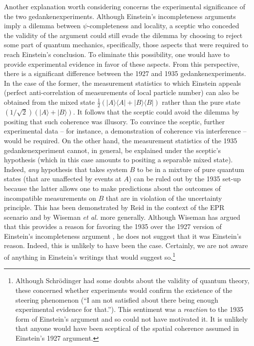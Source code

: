 \documentclass[aps,nofootinbib,12pt]{revtex4}
\begin{document}
Another explanation worth considering concerns the experimental
significance of the two gedankenexperiments. Although Einstein's
incompleteness arguments imply a dilemma between $\psi$-completeness
and locality, a sceptic who conceded the validity of the argument
could still evade the dilemma by choosing to reject some part of
quantum mechanics, specifically, those aspects that were required to
reach Einstein's conclusion. To eliminate this possibility, one
would have to provide experimental evidence in favor of these
aspects. From this perspective, there is a significant difference
between the 1927 and 1935 gedankenexperiments. In the case of the
former, the measurement statistics to which Einstein appeals
(perfect anti-correlation of measurements of local particle number)
can also be obtained from the mixed state
$\tfrac{1}{2}(|A\rangle\langle A|+|B\rangle\langle B|)$ rather than
the pure state $(1/\sqrt{2})(|A\rangle+|B\rangle)$. It follows that
the sceptic could avoid the dilemma by positing that such coherence
was illusory. To convince the sceptic, further experimental data --
for instance, a demonstration of coherence via interference -- would
be required. On the other hand, the measurement statistics of the
1935 gedankenexperiment cannot, in general, be explained under the
sceptic's hypothesis (which in this case amounts to positing a
separable mixed state). Indeed, \textit{any} hypothesis that takes
system $B$ to be in a mixture of pure quantum states (that are
unaffected by events at $A$) can be ruled out by the 1935 set-up
because the latter allows one to make predictions about the outcomes
of incompatible measurements on $B$ that are in violation of the
uncertainty principle. This has been demonstrated by Reid in the
context of the EPR scenario \cite{Reid} and by Wiseman \textit{et
al.}\cite{WJD07} more generally. Although Wiseman has argued that
this provides a reason for favoring the 1935 over the 1927 version
of Einstein's incompleteness argument \cite{Wiseman06}, he does not
suggest that it was Einstein's reason. Indeed, this is unlikely to
have been the case. Certainly, we are not aware of anything in
Einstein's writings that would suggest so.\footnote{Although
Schr\"{o}dinger had some doubts about the validity of quantum
theory, these concerned whether experiments would confirm the
existence of the steering phenomenon (``I am not satisfied about
there being enough experimental evidence for
that.''\cite{schroed_steer_quote}). This sentiment was a
\textit{reaction} to the 1935 form of Einstein's argument and so
could not have motivated it. It is unlikely that anyone would have
been sceptical of the spatial coherence assumed in Einstein's 1927
argument.}
\end{document}
